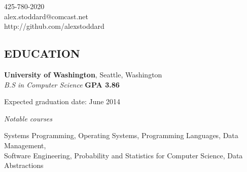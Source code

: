\documentclass[margin,line]{resume}
\begin{document}
{
    \sc
    \hfill 425-780-2020                   \vspace{0mm}\\\vspace{0mm}%
    \hfill alex.stoddard@comcast.net         \vspace{0mm}\\\vspace{0mm}%
    \hfill http://github.com/alexstoddard         \vspace{0mm}\\\vspace{0mm}%
}

\begin{resume}

    \section{\mysidestyle \textbf{\large{E}\small{DUCATION}}}

    \textbf{\listing University of Washington}, Seattle, Washington \vspace{2mm}\\\vspace{1mm}%
    \textsl{B.S in Computer Science} \hfill \textbf{ GPA 3.86 }\vspace{-3mm}\\\vspace{-1mm}%
    \begin{list2}
        \item Expected graduation date: June 2014
    \end{list2}\vspace{-1.5mm}
    \textsl{Notable courses}\vspace{-3mm}\\\vspace{-1mm}%
    \begin{list2}
        \item Systems Programming, Operating Systems, Programming Languages, Data Management,\\
              Software Engineering, Probability and Statistics for Computer Science, Data Abstractions\\
    \end{list2}\vspace{-1.5mm}

\sectionline


\end{resume}
\end{document}
